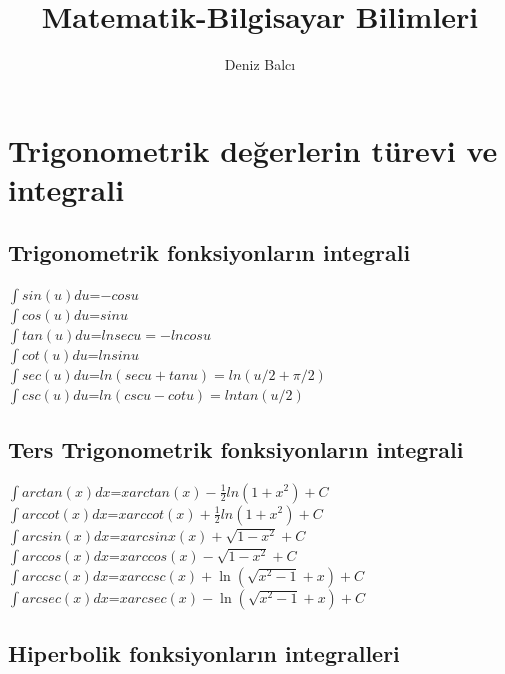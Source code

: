 \documentclass[10pt]{article}
\begin{document}
\title{Matematik-Bilgisayar Bilimleri}
\author{Deniz Balcı\\
}
\renewcommand{\today}{Mayıs 31, 2019}
\maketitle



\section{Trigonometrik değerlerin türevi ve integrali}

\subsection*{Trigonometrik fonksiyonların integrali}

$\displaystyle \int sin(u)du$=$-cosu$\\
$\displaystyle \int cos(u)du$=$sinu$\\
$\displaystyle \int tan(u)du$=$ln secu =-ln cosu$\\
$\displaystyle \int cot(u)du$=$ln sinu $\\
$\displaystyle \int sec(u)du$=$ln (secu+tanu)= ln (u/2+\pi/2)$\\
$\displaystyle \int csc(u)du$=$ln (csc u-cotu)= ln tan (u/2)$\\

\subsection*{Ters Trigonometrik fonksiyonların integrali}

$\displaystyle \int arctan(x)dx$=$xarctan(x)-\frac{1}{2}ln(1+x^2)+C$\\
$\displaystyle \int arccot(x)dx$=$xarccot(x)+\frac{1}{2}ln(1+x^2)+C$\\
$\displaystyle \int arcsin(x)dx$=$xarcsinx(x)+\sqrt{1-x^2}+C$\\
$\displaystyle \int arccos(x)dx$=$xarccos(x)-\sqrt{1-x^2}+C$\\
$\displaystyle \int arccsc(x)dx$=$xarccsc(x)+\ln\left(\sqrt{x^2-1}+x\right)+C$\\
$\displaystyle \int arcsec(x)dx$=$xarcsec(x)-\ln\left(\sqrt{x^2-1}+x\right)+C$
\subsection*{Hiperbolik fonksiyonların integralleri}
\end{document}
